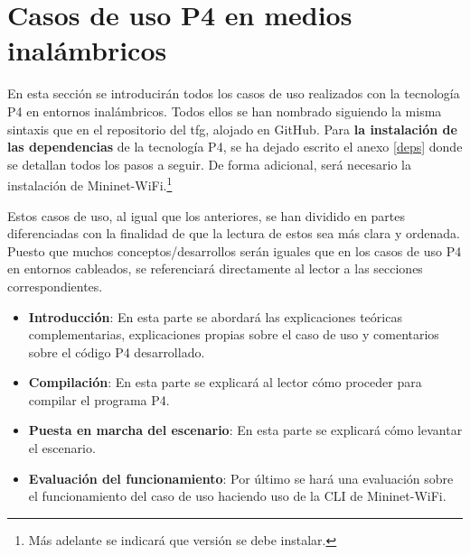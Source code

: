 \newpage








\section{Casos de uso P4 en medios inalámbricos}

En esta sección se introducirán todos los casos de uso realizados con la tecnología P4 en entornos inalámbricos. Todos ellos se han nombrado siguiendo la misma sintaxis que en el repositorio del \gls{tfg}, alojado en GitHub. Para \textbf{la instalación de las dependencias} de la tecnología P4, se ha dejado escrito el anexo \ref{deps} donde se detallan todos los pasos a seguir. De forma adicional, será necesario la instalación de Mininet-WiFi.\footnote{Más adelante se indicará que versión se debe instalar.} \\
\par

Estos casos de uso, al igual que los anteriores, se han dividido en partes diferenciadas con la finalidad de que la lectura de estos sea más clara y ordenada. Puesto que muchos conceptos/desarrollos serán iguales que en los casos de uso P4 en entornos cableados, se referenciará directamente al lector a las secciones correspondientes.

\begin{itemize}
    \item \textbf{Introducción}: En esta parte se abordará las explicaciones teóricas complementarias, explicaciones propias sobre el caso de uso y comentarios sobre el código P4 desarrollado.
    
    \item \textbf{Compilación}: En esta parte se explicará al lector cómo proceder para compilar el programa P4. 
    
    \item \textbf{Puesta en marcha del escenario}: En esta parte se explicará cómo levantar el escenario. 
    
    \item \textbf{Evaluación del funcionamiento}: Por último se hará una evaluación sobre el funcionamiento del caso de uso haciendo uso de la CLI de Mininet-WiFi.
\end{itemize}

